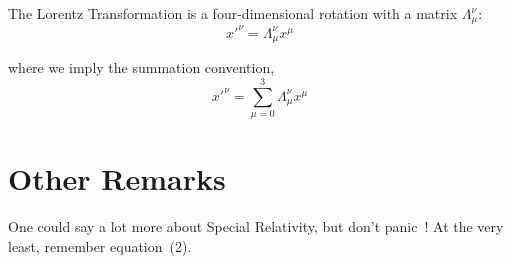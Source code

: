 \documentclass[10pt,twocolumn]{article}
\begin{document}
The Lorentz Transformation is a four-dimensional rotation with a matrix $\Lambda^\nu_\mu$:
\begin{equation}
x'^\nu = \Lambda^\nu_\mu x^\mu
\end{equation}

where we imply the summation convention,
\begin{equation}
x'^\nu = \sum_{\mu=0}^3 \Lambda^\nu_\mu x^\mu
\end{equation}

\section{Other Remarks}

One could say a lot more about Special Relativity, but don't panic~\cite{ref5}! At the very least, remember equation~(2).
\end{document}
